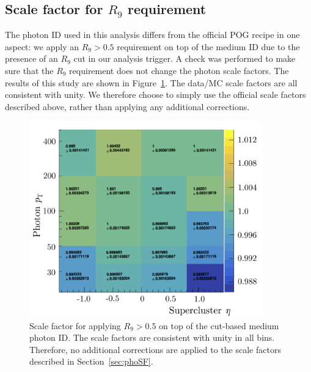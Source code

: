 \subsection{Scale factor for $R_9$ requirement}
\label{sec:R9SF}
The photon ID used in this analysis differs from the official POG recipe in one aspect: we apply an $R_9 > 0.5$ requirement on top of the medium ID due to the presence of an $R_9$ cut in our analysis trigger. A check was performed to make sure that the $R_9$ requirement does not change the photon scale factors. The results of this study are shown in Figure~\ref{fig:R9SF}. The data/MC scale factors are all consistent with unity. We therefore choose to simply use the official scale factors described above, rather than applying any additional corrections.

\begin{figure}[htbp]
    \centering
    \includegraphics[width=0.9\textwidth]{Figures/EventSelect/R9SF.pdf}
    \caption[Scale factor for applying $R_9 > 0.5$ on top of the cut-based medium photon ID.]
    {Scale factor for applying $R_9 > 0.5$ on top of the cut-based medium photon ID.
    The scale factors are consistent with unity in all bins. Therefore, no additional corrections are applied to
    the scale factors described in Section~\ref{sec:phoSF}.}
    \label{fig:R9SF}
\end{figure}


